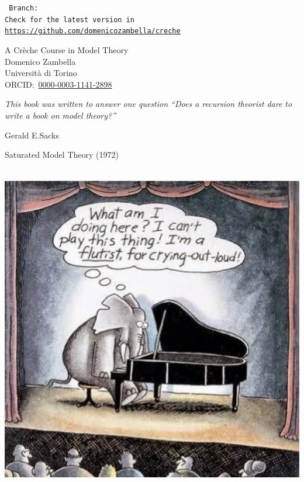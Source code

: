 \documentclass[10pt,openany]{book}
\theoremstyle{mio}
\newcommand\branch{}
\begin{document}
\raggedbottom
\begin{titlepage}
\begin{flushright}
\tt
Branch:\ \branch\ \DTMnow\\[.5ex]
Check for the latest version in\\[.5ex]
\href{https://github.com/domenicozambella/creche}{\tt https://github.com/domenicozambella/creche}
\end{flushright}
\vspace*{2ex}

{\Large A Cr\`eche Course in Model Theory}\\[2ex]%

Domenico Zambella\\[.5ex]
Universit\`a di Torino\\[.5ex]
ORCID:~\href{https://orcid.org/0000-0003-1141-2898}%
{0000-0003-1141-2898}\\[19ex]

\hfill
\begin{minipage}{.7\textwidth}
  \sl This book was written to answer one question ``Does a recursion theorist dare to write a book on model theory?''

\hfill Gerald E.\@ Sacks

\hfill Saturated Model Theory (1972)
\end{minipage}\\[8ex]

\hfill
\includegraphics[width=.5\textwidth]{elephant_playing_piano.jpg}
\hspace*{.1\textwidth}
\end{titlepage}
\end{document}
